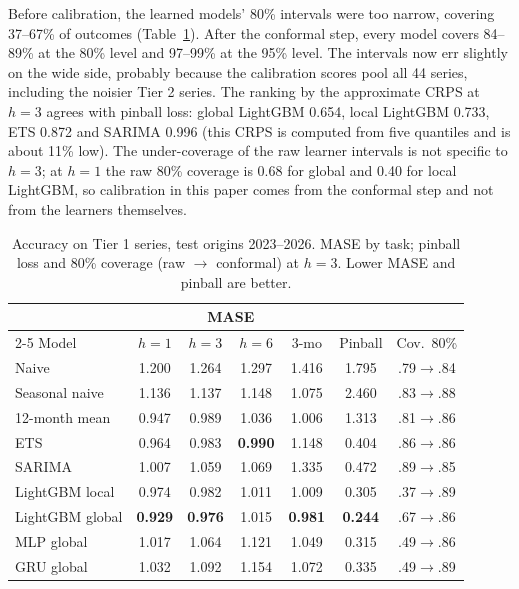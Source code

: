 \documentclass[conference]{IEEEtran}
\begin{document}
Before calibration, the learned models' 80\% intervals were too narrow, covering 37--67\% of outcomes (Table~\ref{tab:accuracy}). After the conformal step, every model covers 84--89\% at the 80\% level and 97--99\% at the 95\% level. The intervals now err slightly on the wide side, probably because the calibration scores pool all 44 series, including the noisier Tier 2 series. The ranking by the approximate CRPS at $h=3$ agrees with pinball loss: global LightGBM 0.654, local LightGBM 0.733, ETS 0.872 and SARIMA 0.996 (this CRPS is computed from five quantiles and is about 11\% low). The under-coverage of the raw learner intervals is not specific to $h=3$; at $h=1$ the raw 80\% coverage is 0.68 for global and 0.40 for local LightGBM, so calibration in this paper comes from the conformal step and not from the learners themselves.

\begin{table}[t]
\centering
\caption{Accuracy on Tier 1 series, test origins 2023--2026. MASE by task; pinball loss and 80\% coverage (raw $\rightarrow$ conformal) at $h=3$. Lower MASE and pinball are better.}
\label{tab:accuracy}
\small
\setlength{\tabcolsep}{3pt}
\begin{tabular}{@{}lccccc c@{}}
\toprule
 & \multicolumn{4}{c}{MASE} & & \\
\cmidrule(lr){2-5}
Model & $h{=}1$ & $h{=}3$ & $h{=}6$ & 3-mo & Pinball & Cov.\ 80\%\\
\midrule
Naive & 1.200 & 1.264 & 1.297 & 1.416 & 1.795 & .79$\rightarrow$.84\\
Seasonal naive & 1.136 & 1.137 & 1.148 & 1.075 & 2.460 & .83$\rightarrow$.88\\
12-month mean & 0.947 & 0.989 & 1.036 & 1.006 & 1.313 & .81$\rightarrow$.86\\
ETS & 0.964 & 0.983 & \textbf{0.990} & 1.148 & 0.404 & .86$\rightarrow$.86\\
SARIMA & 1.007 & 1.059 & 1.069 & 1.335 & 0.472 & .89$\rightarrow$.85\\
LightGBM local & 0.974 & 0.982 & 1.011 & 1.009 & 0.305 & .37$\rightarrow$.89\\
LightGBM global & \textbf{0.929} & \textbf{0.976} & 1.015 & \textbf{0.981} & \textbf{0.244} & .67$\rightarrow$.86\\
MLP global & 1.017 & 1.064 & 1.121 & 1.049 & 0.315 & .49$\rightarrow$.86\\
GRU global & 1.032 & 1.092 & 1.154 & 1.072 & 0.335 & .49$\rightarrow$.89\\
\bottomrule
\end{tabular}
\end{table}
\end{document}

